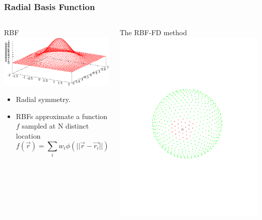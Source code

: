 \documentclass{beamer}
\begin{document}
\begin{frame}[fragile]
  \frametitle{Radial Basis Function}
  \begin{columns}

    \begin{block}{RBF}
      \includegraphics[width=\linewidth]{slides-figures/rbf.pdf}
      
      \begin{itemize}
      \item Radial symmetry.
      \item RBFs approximate a function $f$ sampled at N distinct location $$f(\vec{r}) = \sum_i w_i \phi(||\vec{r}-\vec{r_i}||)$$ 
      \end{itemize}
    \end{block}
    
    \begin{block}{The RBF-FD method}
      \includegraphics[width=.8\linewidth]{slides-figures/ICS-figures/RBFStencil_n32_a}
      

\end{block}
\end{columns}
\end{frame}
\end{document}
